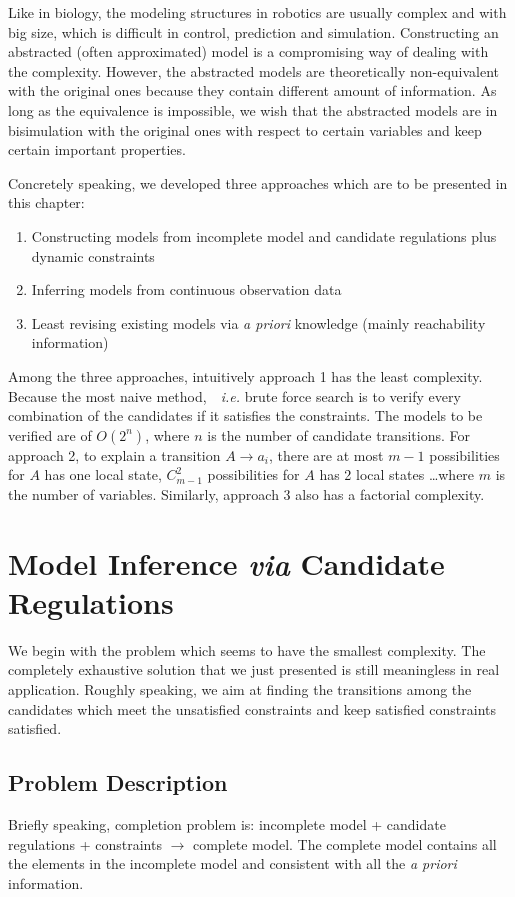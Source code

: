 Like in biology, the modeling structures in robotics are usually complex and with big size, which is difficult in control, prediction and simulation.
Constructing an abstracted (often approximated) model is a compromising way of dealing with the complexity.
However, the abstracted models are theoretically non-equivalent with the original ones because they contain different amount of information.
As long as the equivalence is impossible, we wish that the abstracted models are in bisimulation with the original ones with respect to certain variables and keep certain important properties.

Concretely speaking, we developed three approaches which are to be presented in this chapter:

\begin{enumerate}
    \item Constructing models from incomplete model and candidate regulations plus dynamic constraints
    \item Inferring models from continuous observation data
    \item Least revising existing models via \textit{a priori} knowledge (mainly reachability information)
\end{enumerate}

Among the three approaches, intuitively approach 1 has the least complexity. 
Because the most naive method,　\textit{i.e.} brute force search is to verify every combination of the candidates if it satisfies the constraints. 
The models to be verified are of $O(2^n)$, where $n$ is the number of candidate transitions.
For approach 2, to explain a transition $A\to a_i$, there are at most $m-1$ possibilities for $A$ has one local state, $C_{m-1}^2$ possibilities for $A$ has 2 local states \ldots where $m$ is the number of variables.
Similarly, approach 3 also has a factorial complexity.

\section{Model Inference \textit{via} Candidate Regulations}
We begin with the problem which seems to have the smallest complexity.
The completely exhaustive solution that we just presented is still meaningless in real application.
Roughly speaking, we aim at finding the transitions among the candidates which meet the unsatisfied constraints and keep satisfied constraints satisfied.

\subsection{Problem Description}
Briefly speaking, completion problem is: incomplete model + candidate regulations + constraints $\to$ complete model.
The complete model contains all the elements in the incomplete model and consistent with all the \textit{a priori} information. 

